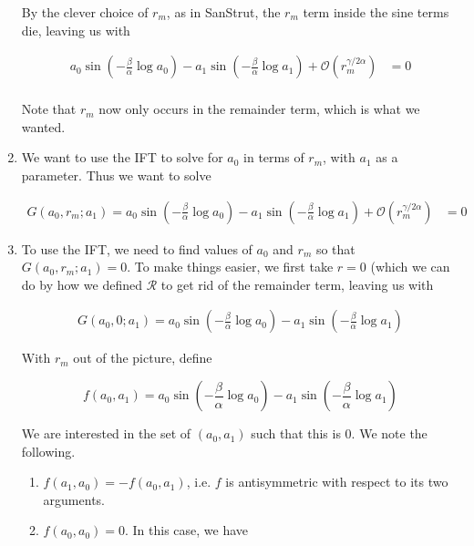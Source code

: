 \documentclass[12pt]{article}
\begin{document}
\begin{enumerate}
By the clever choice of $r_m$, as in SanStrut, the $r_m$ term inside the sine terms die, leaving us with

\begin{align}\label{jumpeq4}
a_0 \sin \left( - \frac{\beta}{\alpha} \log a_0 \right) - a_1 \sin \left( - \frac{\beta}{\alpha} \log a_1 \right) + \mathcal{O}(r_m^{\gamma / 2 \alpha}) &= 0 \\
\end{align}

Note that $r_m$ now only occurs in the remainder term, which is what we wanted.

\item We want to use the IFT to solve for $a_0$ in terms of $r_m$, with $a_1$ as a parameter. Thus we want to solve

\begin{align*}
G(a_0, r_m; a_1) = 
a_0 \sin \left( -\frac{\beta}{\alpha} \log a_0 \right) - a_1 \sin \left( - \frac{\beta}{\alpha} \log a_1 \right) + \mathcal{O}(r_m^{\gamma / 2 \alpha}) &= 0
\end{align*}

\item To use the IFT, we need to find values of $a_0$ and $r_m$ so that $G(a_0, r_m; a_1) = 0$. To make things easier, we first take $r = 0$ (which we can do by how we defined $\mathcal{R}$ to get rid of the remainder term, leaving us with

\begin{align*}
G(a_0, 0; a_1) = 
a_0 \sin \left( - \frac{\beta}{\alpha} \log a_0 \right) - a_1 \sin \left( - \frac{\beta}{\alpha} \log a_1 \right)
\end{align*}

With $r_m$ out of the picture, define

\begin{equation}
f(a_0, a_1) = 
a_0 \sin \left( - \frac{\beta}{\alpha} \log a_0 \right) - a_1 \sin \left( - \frac{\beta}{\alpha} \log a_1 \right)
\end{equation}

We are interested in the set of $(a_0, a_1)$ such that this is 0. We note the following.

\begin{enumerate}
	\item $f(a_1, a_0) = -f(a_0, a_1)$, i.e. $f$ is antisymmetric with respect to its two arguments.

	\item $f(a_0, a_0) = 0$. In this case, we have


\end{enumerate}
\end{enumerate}
\end{document}
